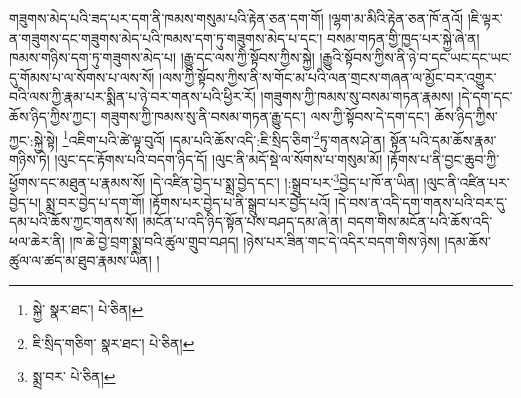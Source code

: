 གཟུགས་མེད་པའི་ཟད་པར་དག་ནི་ཁམས་གསུམ་པའི་རྟེན་ཅན་དག་གོ། །ལྷག་མ་མིའི་རྟེན་ཅན་ཁོ་ནའོ། །ཇི་ལྟར་ན་གཟུགས་དང་གཟུགས་མེད་པའི་ཁམས་དག་ཏུ་གཟུགས་མེད་པ་དང་། བསམ་གཏན་གྱི་ཁྱད་པར་སྐྱེ་ཞེ་ན། ཁམས་གཉིས་དག་ཏུ་གཟུགས་མེད་པ། །རྒྱུ་དང་ལས་ཀྱི་སྟོབས་ཀྱིས་སྐྱེ། །རྒྱུའི་སྟོབས་ཀྱིས་ནི་ཉེ་བ་དང་ཡང་དང་ཡང་དུ་གོམས་པ་ལ་སོགས་པ་ལས་སོ། །ལས་ཀྱི་སྟོབས་ཀྱིས་ནི་ས་གོང་མ་པའི་ལན་གྲངས་གཞན་ལ་མྱོང་བར་འགྱུར་བའི་ལས་ཀྱི་རྣམ་པར་སྨིན་པ་ཉེ་བར་གནས་པའི་ཕྱིར་རོ། །གཟུགས་ཀྱི་ཁམས་སུ་བསམ་གཏན་རྣམས། །དེ་དག་དང་ཆོས་ཉིད་ཀྱིས་ཀྱང་། གཟུགས་ཀྱི་ཁམས་སུ་ནི་བསམ་གཏན་རྒྱུ་དང་། ལས་ཀྱི་སྟོབས་དེ་དག་དང་། ཆོས་ཉིད་ཀྱིས་ཀྱང་:སྐྱེ་སྟེ། \footnote{སྐྱེ་  སྣར་ཐང་།  པེ་ཅིན། }འཇིག་པའི་ཚེ་ལྟ་བུའོ། །དམ་པའི་ཆོས་འདི་:ཇི་སྲིད་ཅིག་\footnote{ཇི་སྲིད་གཅིག་  སྣར་ཐང་།  པེ་ཅིན། }ཏུ་གནས་ཤེ་ན། སྟོན་པའི་དམ་ཆོས་རྣམ་གཉིས་ཏེ། །ལུང་དང་རྟོགས་པའི་བདག་ཉིད་དོ། །ལུང་ནི་མདོ་སྡེ་ལ་སོགས་པ་གསུམ་མོ། །རྟོགས་པ་ནི་བྱང་ཆུབ་ཀྱི་ཕྱོགས་དང་མཐུན་པ་རྣམས་སོ། །དེ་འཛིན་བྱེད་པ་སྨྲ་བྱེད་དང་། །:སྒྲུབ་པར་\footnote{སྨྲ་བར་  པེ་ཅིན། }བྱེད་པ་ཁོ་ན་ཡིན། །ལུང་ནི་འཛིན་པར་བྱེད་པ། སྨྲ་བར་བྱེད་པ་དག་གོ། །རྟོགས་པར་བྱེད་པ་ནི་སྒྲུབ་པར་བྱེད་པའོ། །དེ་བས་ན་འདི་དག་གནས་པའི་བར་དུ་དམ་པའི་ཆོས་ཀྱང་གནས་སོ། །མངོན་པ་འདི་ཉིད་སྟོན་པས་བཤད་དམ་ཞེ་ན། བདག་གིས་མངོན་པའི་ཆོས་འདི་ཕལ་ཆེར་ནི། །ཁ་ཆེ་བྱེ་བྲག་སྨྲ་བའི་ཚུལ་གྲུབ་བཤད། །ཉེས་པར་ཟིན་གང་དེ་འདིར་བདག་གིས་ཉེས། །དམ་ཆོས་ཚུལ་ལ་ཚད་མ་ཐུབ་རྣམས་ཡིན། །
